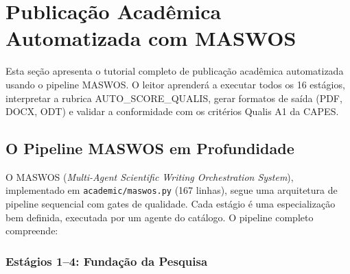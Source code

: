 \section{Publicação Acadêmica Automatizada com MASWOS}
\label{sec:maswos-tutorial}

Esta seção apresenta o tutorial completo de publicação acadêmica automatizada usando o pipeline MASWOS. O leitor aprenderá a executar todos os 16 estágios, interpretar a rubrica AUTO\_SCORE\_QUALIS, gerar formatos de saída (PDF, DOCX, ODT) e validar a conformidade com os critérios Qualis A1 da CAPES.

\subsection{O Pipeline MASWOS em Profundidade}
\label{sec:maswos-deep}

O MASWOS (\textit{Multi-Agent Scientific Writing Orchestration System}), implementado em \texttt{academic/maswos.py} (167 linhas), segue uma arquitetura de pipeline sequencial com gates de qualidade. Cada estágio é uma especialização bem definida, executada por um agente do catálogo. O pipeline completo compreende:

\subsubsection{Estágios 1--4: Fundação da Pesquisa}

